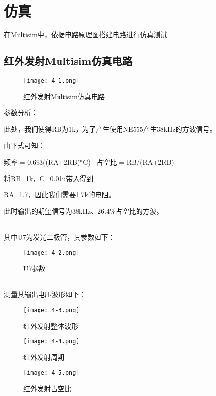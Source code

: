 \chapter{仿真}
\label{cha:intro}
在Multisim中，依据电路原理图搭建电路进行仿真测试
\section{红外发射Multisim仿真电路}
\begin{figure}[H] %
    \centering
    \texttt{[image: 4-1.png]}
    \caption{红外发射Multisim仿真电路}
    \label{fig:xfig1}
\end{figure}

参数分析：

此处，我们使得RB为1k，为了产生使用NE555产生38kHz的方波信号。

由下式可知：

频率 = 0.693((RA+2RB)*C) 
占空比 = RB/(RA+2RB)

将RB=1k，C=0.01u带入得到

RA=1.7，因此我们需要1.7k的电阻。

此时输出的期望信号为38kHz、26.4\%占空比的方波。

~\\

其中U7为发光二极管，其参数如下：
\begin{figure}[H] %
    \centering
    \texttt{[image: 4-2.png]}
    \caption{U7参数}
    \label{fig:xfig1}
 \end{figure}
 ~\\

测量其输出电压波形如下：
\begin{figure}[H] %
    \centering
    \texttt{[image: 4-3.png]}
    \caption{红外发射整体波形}
    \label{fig:xfig1}
\end{figure}
\begin{figure}[H] %
    \centering
    \texttt{[image: 4-4.png]}
    \caption{红外发射周期}
    \label{fig:xfig1}
\end{figure}
\begin{figure}[H] %
    \centering
    \texttt{[image: 4-5.png]}
    \caption{红外发射占空比}
    \label{fig:xfig1}
\end{figure}



